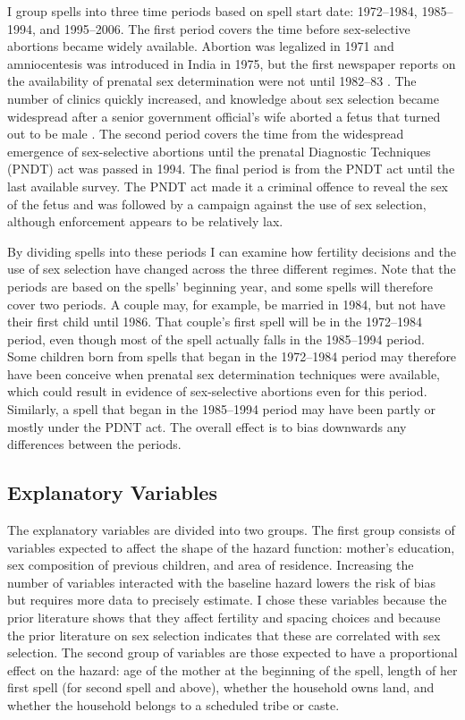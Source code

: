 \documentclass[12pt,letterpaper]{article}
\begin{document}
I group spells into three time periods based on spell start date:
1972--1984, 1985--1994, and 1995--2006.
The first period covers the time before sex-selective abortions became widely available.
Abortion was legalized in 1971 and amniocentesis was introduced
in India in 1975, but the first newspaper reports on the availability of prenatal sex 
determination were not until 1982--83 \citep{Sudha1999,bhat06,Grover2006}.
The number of clinics quickly increased, and knowledge about sex selection became widespread
after a senior government official's wife aborted a fetus that turned out to be male \citep[p.\ 598]{Sudha1999}.
The second period covers the time from the widespread emergence of sex-selective abortions
until the prenatal Diagnostic Techniques (PNDT) act was passed in 1994.
The final period is from the PNDT act until the last available survey.
The PNDT act made it a criminal offence to reveal the sex of the fetus and was
followed by a campaign against the use of sex selection, although
enforcement appears to be relatively lax.

By dividing spells into these periods I can examine how fertility
decisions and the use of sex selection have changed across the three different regimes.
Note that the periods are based on the spells' beginning year, and some spells 
will therefore cover two periods.
A couple may, for example, be married in 1984, but not have their first child until 1986.
That couple's first spell will be in the 1972--1984 period, even though most of the 
spell actually falls in the 1985--1994 period.
Some children born from spells that began in the 1972--1984 period may therefore have been
conceive when prenatal sex determination techniques were available, which could result
in evidence of sex-selective abortions even for this period.
Similarly, a spell that began in the 1985--1994 period may have been partly or mostly
under the PDNT act.
The overall effect is to bias downwards any differences between the periods.

\subsection{Explanatory Variables}

The explanatory variables are divided into two groups.
The first group consists of variables expected to affect the shape of the hazard function: 
mother's education, sex composition of previous children, and area of residence.
Increasing the number of variables interacted with the baseline hazard lowers the risk 
of bias but requires more data to precisely estimate.
I chose these variables because the prior literature shows that they affect 
fertility and spacing choices and because the prior literature on sex selection indicates 
that these are correlated with sex selection.
The second group of variables are those expected to have a proportional effect on the 
hazard: age of the mother at the beginning of the spell, length of her first spell 
(for second spell and above), whether the household owns land, and whether the household 
belongs to a scheduled tribe or caste.
\end{document}
